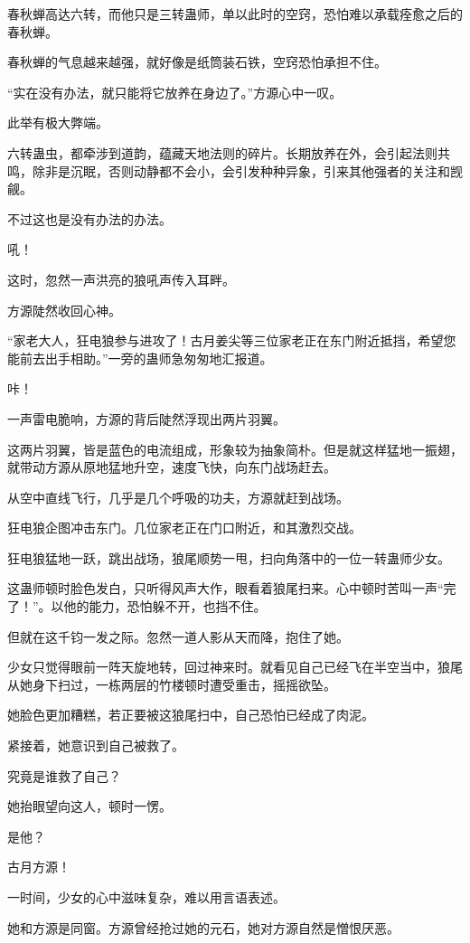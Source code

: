 \begin{this_body}
春秋蝉高达六转，而他只是三转蛊师，单以此时的空窍，恐怕难以承载痊愈之后的春秋蝉。

春秋蝉的气息越来越强，就好像是纸筒装石铁，空窍恐怕承担不住。

“实在没有办法，就只能将它放养在身边了。”方源心中一叹。

此举有极大弊端。

六转蛊虫，都牵涉到道韵，蕴藏天地法则的碎片。长期放养在外，会引起法则共鸣，除非是沉眠，否则动静都不会小，会引发种种异象，引来其他强者的关注和觊觎。

不过这也是没有办法的办法。

吼！

这时，忽然一声洪亮的狼吼声传入耳畔。

方源陡然收回心神。

“家老大人，狂电狼参与进攻了！古月姜尖等三位家老正在东门附近抵挡，希望您能前去出手相助。”一旁的蛊师急匆匆地汇报道。

咔！

一声雷电脆响，方源的背后陡然浮现出两片羽翼。

这两片羽翼，皆是蓝色的电流组成，形象较为抽象简朴。但是就这样猛地一振翅，就带动方源从原地猛地升空，速度飞快，向东门战场赶去。

从空中直线飞行，几乎是几个呼吸的功夫，方源就赶到战场。

狂电狼企图冲击东门。几位家老正在门口附近，和其激烈交战。

狂电狼猛地一跃，跳出战场，狼尾顺势一甩，扫向角落中的一位一转蛊师少女。

这蛊师顿时脸色发白，只听得风声大作，眼看着狼尾扫来。心中顿时苦叫一声“完了！”。以他的能力，恐怕躲不开，也挡不住。

但就在这千钧一发之际。忽然一道人影从天而降，抱住了她。

少女只觉得眼前一阵天旋地转，回过神来时。就看见自己已经飞在半空当中，狼尾从她身下扫过，一栋两层的竹楼顿时遭受重击，摇摇欲坠。

她脸色更加糟糕，若正要被这狼尾扫中，自己恐怕已经成了肉泥。

紧接着，她意识到自己被救了。

究竟是谁救了自己？

她抬眼望向这人，顿时一愣。

是他？

古月方源！

一时间，少女的心中滋味复杂，难以用言语表述。

她和方源是同窗。方源曾经抢过她的元石，她对方源自然是憎恨厌恶。


\end{this_body}
